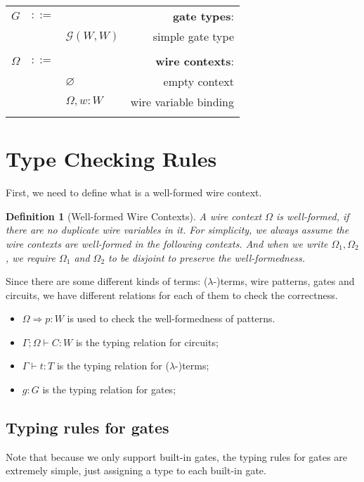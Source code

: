 \documentclass[12pt]{article}
\newtheorem{Def}{Definition}
\begin{document}
\begin{longtable}[c]{lclr}
  $G$ &$::=$ &  &\textbf{gate types}:\\
      & &$\mathcal{G}(W, W)$ &simple gate type\\
  \\

  $\Omega$ &$::=$ &  &\textbf{wire contexts}: \\
      & &$\varnothing$ &empty context\\
      & &$\Omega,w:W$ &wire variable binding\\
  \\

  \bottomrule
  
\end{longtable}

\section{Type Checking Rules}
First, we need to define what is a well-formed wire context.
\begin{Def}[Well-formed Wire Contexts]
  A wire context $\Omega$ is well-formed, if there are no duplicate wire variables in it.
  For simplicity, we always assume the wire contexts are well-formed in the following contexts. And when we write $\Omega_1, \Omega_2$, we require $\Omega_1$ and $\Omega_2$ to be disjoint to preserve the well-formedness.
\end{Def}

Since there are some different kinds of terms: ($\lambda$-)terms, wire patterns, gates and circuits, we have different relations for each of them to check the correctness.
\begin{itemize}
  \item $\Omega \Rightarrow p : W$ is used to check the well-formedness of patterns.
  \item $\Gamma ; \Omega \vdash C : W$ is the typing relation for circuits;
  \item $\Gamma \vdash t:T$ is the typing relation for ($\lambda$-)terms;
  \item $g : G$ is the typing relation for gates;
\end{itemize}

\subsection{Typing rules for gates}
Note that because we only support built-in gates, the typing rules for gates are extremely simple, just assigning a type to each built-in gate.
\end{document}
